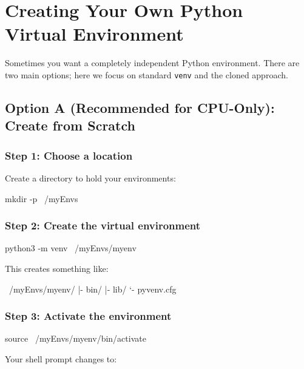 \documentclass[11pt]{article}
\begin{document}
\section{Creating Your Own Python Virtual Environment}
\label{sec:create-own-env}

Sometimes you want a completely independent Python environment. There are two main options; here we focus on standard \texttt{venv} and the cloned approach.

\subsection{Option A (Recommended for CPU-Only): Create from Scratch}

\subsubsection{Step 1: Choose a location}

Create a directory to hold your environments:\\
\begin{codeblock}
mkdir -p ~/myEnvs
\end{codeblock}

\subsubsection{Step 2: Create the virtual environment}

\begin{codeblock}
python3 -m venv ~/myEnvs/myenv
\end{codeblock}


This creates something like:\\
\begin{codeblock}
~/myEnvs/myenv/
|- bin/
|- lib/
`- pyvenv.cfg
\end{codeblock}


\subsubsection{Step 3: Activate the environment}

\begin{codeblock}
source ~/myEnvs/myenv/bin/activate
\end{codeblock}

Your shell prompt changes to:\\
\end{document}
